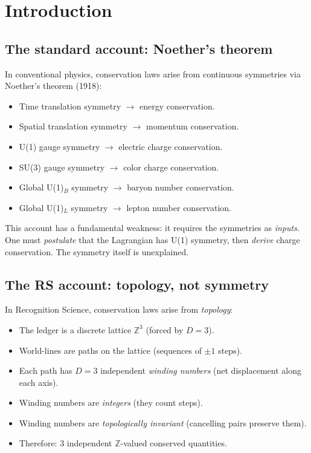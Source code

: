 \documentclass[11pt,a4paper]{article}
\theoremstyle{plain}
\theoremstyle{definition}
\theoremstyle{remark}
\newcommand{\Z}{\mathbb{Z}}
\begin{document}
\tableofcontents
\newpage

\section{Introduction}
\label{sec:intro}

\subsection{The standard account: Noether's theorem}

In conventional physics, conservation laws arise from continuous
symmetries via Noether's theorem (1918):
\begin{itemize}[nosep]
\item Time translation symmetry $\to$ energy conservation.
\item Spatial translation symmetry $\to$ momentum conservation.
\item U(1) gauge symmetry $\to$ electric charge conservation.
\item SU(3) gauge symmetry $\to$ color charge conservation.
\item Global U(1)$_B$ symmetry $\to$ baryon number conservation.
\item Global U(1)$_L$ symmetry $\to$ lepton number conservation.
\end{itemize}

This account has a fundamental weakness: it requires the symmetries as
\emph{inputs}.  One must \emph{postulate} that the Lagrangian has U(1)
symmetry, then \emph{derive} charge conservation.  The symmetry itself
is unexplained.

\subsection{The RS account: topology, not symmetry}

In Recognition Science, conservation laws arise from \emph{topology}:
\begin{itemize}[nosep]
\item The ledger is a discrete lattice $\Z^3$ (forced by $D = 3$).
\item World-lines are paths on the lattice (sequences of $\pm 1$ steps).
\item Each path has $D = 3$ independent \emph{winding numbers} (net displacement along each axis).
\item Winding numbers are \emph{integers} (they count steps).
\item Winding numbers are \emph{topologically invariant} (cancelling pairs preserve them).
\item Therefore: 3 independent $\Z$-valued conserved quantities.
\end{itemize}
\end{document}
